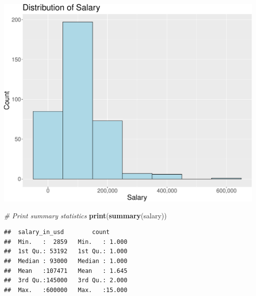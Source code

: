 \documentclass[
]{article}
\newenvironment{Shaded}{\begin{snugshade}}{\end{snugshade}}
\newcommand{\CommentTok}[1]{\textcolor[rgb]{0.56,0.35,0.01}{\textit{#1}}}
\newcommand{\FunctionTok}[1]{\textcolor[rgb]{0.13,0.29,0.53}{\textbf{#1}}}
\newcommand{\NormalTok}[1]{#1}
\begin{document}
\includegraphics{Susman_RProject_files/figure-latex/unnamed-chunk-18-1.pdf}

\begin{Shaded}
\begin{Highlighting}[]
\CommentTok{\# Print summary statistics}
\FunctionTok{print}\NormalTok{(}\FunctionTok{summary}\NormalTok{(salary))}
\end{Highlighting}
\end{Shaded}

\begin{verbatim}
##  salary_in_usd        count       
##  Min.   :  2859   Min.   : 1.000  
##  1st Qu.: 53192   1st Qu.: 1.000  
##  Median : 93000   Median : 1.000  
##  Mean   :107471   Mean   : 1.645  
##  3rd Qu.:145000   3rd Qu.: 2.000  
##  Max.   :600000   Max.   :15.000
\end{verbatim}
\end{document}
